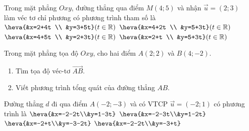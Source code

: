
\begin{ex}%
	Trong mặt phẳng $Oxy$, đường thẳng qua điểm $M(4; 5)$ và nhận $\overrightarrow{u}=(2; 3)$ làm  véc tơ chỉ phương có phương trình tham số là
	\choice 
		{$\heva{&x=2+4t \\ &y=3+5t}(t  \in \mathbb{R})$}
		{\True $\heva{&x=4+2t \\  &y=5+3t}(t \in \mathbb{R})$}
		{$\heva{&x=4+5t  \\ &y=2+3t}(t \in \mathbb{R})$}
		{$\heva{&x=2+t \\ &y=5+3t}(t \in \mathbb{R})$} 
\end{ex}

\begin{bt}%
	Trong mặt phẳng tọa độ $Oxy$,  cho hai điểm $A(2;2)$ và $B(4;-2)$.
	\begin{enumerate}
		\item  Tìm tọa độ véc-tơ $\overrightarrow{AB}$.
		\item Viết phương trình tổng quát  của đường thẳng $AB$.
	\end{enumerate}
\end{bt}

\begin{ex}%
	Đường thẳng $d$ đi  qua điểm $A\left(-2;-3\right)$ và có VTCP $\overrightarrow{u}=\left(-2;1\right)$ có phương trình là
	\choice 
		{$\heva{&x=-2-2t\\&y=1-3t}$} 
		{$\heva{&x=-2-3t\\&y=1-2t}$} 
		{$\heva{&x=-2+t\\&y=-3-2t}$} 
		{\True $\heva{&x=-2-2t\\&y=-3+t}$} 
\end{ex}

